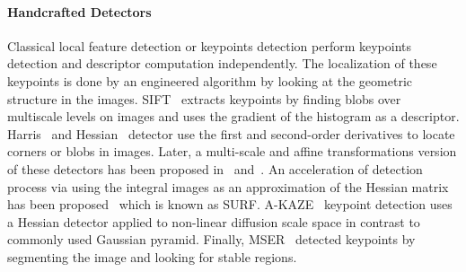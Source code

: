 \documentclass[journal]{IEEEtran}
\begin{document}
\paragraph{Handcrafted Detectors}
Classical local feature detection or keypoints detection perform keypoints detection and descriptor computation independently. The localization of these keypoints is done by an engineered algorithm by looking at the geometric structure in the images. SIFT~\cite{lowe2004distinctive} extracts keypoints by finding blobs over multiscale levels on images and uses the gradient of the histogram as a descriptor. Harris~\cite{harris1988combined} and Hessian~\cite{beaudet1978rotationally} detector use the first and second-order derivatives to locate corners or blobs in images. Later, a multi-scale and affine transformations version of these detectors has been proposed in~\cite{mikolajczyk2004scale} and~\cite{tuytelaars2008local}. An acceleration of detection process via using the integral images as an approximation of the Hessian matrix has been proposed~\cite{bay2008speeded} which is known as SURF. A-KAZE~\cite{alcantarilla2011fast} keypoint detection uses a Hessian detector applied to non-linear diffusion scale space in contrast to commonly used Gaussian pyramid. Finally, MSER~\cite{matas2004robust} detected keypoints by segmenting the image and looking for stable regions.
\end{document}
